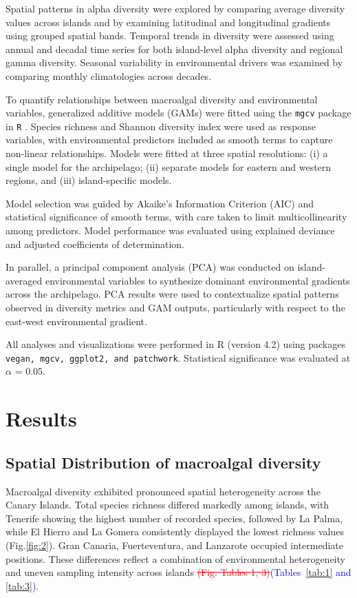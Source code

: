 \documentclass[a4paper,fleqn]{cas-sc}
\DeclareRobustCommand{\deleted}[1]{\textcolor{red}{\sout{#1}}}
\DeclareRobustCommand{\added}[1]{\textcolor{blue}{#1}}
\begin{document}
Spatial patterns in alpha diversity were explored by comparing average diversity values across islands and by examining latitudinal and longitudinal gradients using grouped spatial bands. Temporal trends in diversity were assessed using annual and decadal time series for both island-level alpha diversity and regional gamma diversity. Seasonal variability in environmental drivers was examined by comparing monthly climatologies across decades.

To quantify relationships between macroalgal diversity and environmental variables, generalized additive models (GAMs) were fitted using the \texttt{mgcv} package in \texttt{R} \citep{Wood2017}. Species richness and Shannon diversity index were used as response variables, with environmental predictors included as smooth terms to capture non-linear relationships. Models were fitted at three spatial resolutions: (i) a single model for the archipelago; (ii) separate models for eastern and western regions, and (iii) island-specific models. 

Model selection was guided by Akaike's Information Criterion (AIC) and statistical significance of smooth terms, with care taken to limit multicollinearity among predictors. Model performance was evaluated using explained deviance and adjusted coefficients of determination.

In parallel, a principal component analysis (PCA) was conducted on island-averaged environmental variables to synthesize dominant environmental gradients across the archipelago. PCA results were used to contextualize spatial patterns observed in diversity metrics and GAM outputs, particularly with respect to the east-west environmental gradient. 

All analyses and visualizations were performed in R (version 4.2) using packages \texttt{vegan, mgcv, ggplot2, and patchwork}. Statistical significance was evaluated at $\alpha$ = 0.05. 

\section{Results}
\subsection{Spatial Distribution of macroalgal diversity}

Macroalgal diversity exhibited pronounced spatial heterogeneity across the Canary Islands. Total species richness differed markedly among islands, with Tenerife showing the highest number of recorded species, followed by La Palma, while El Hierro and La Gomera consistently displayed the lowest richness values (Fig.\ref{fig:2}). Gran Canaria, Fuerteventura, and Lanzarote occupied intermediate positions. These differences reflect a combination of environmental heterogeneity and uneven sampling intensity across islands \deleted{(Fig. Tables 1, 3)}\added{(Tables~\ref{tab:1} and \ref{tab:3})}.
\end{document}
